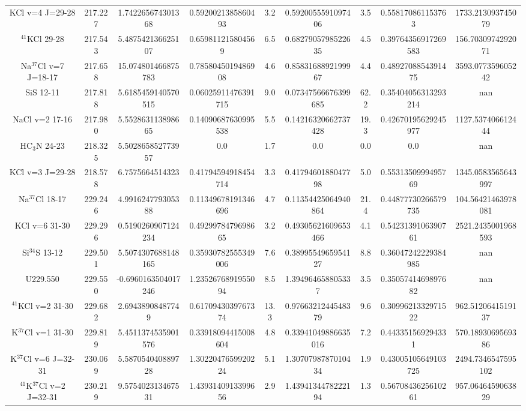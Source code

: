 \begin{table*}[htp]
\begin{tabular}{ccccccccc}
KCl v=4 J=29-28 & 217.227 & 1.742265674301368 & 0.5920021385860493 & 3.2 & 0.5920055591097406 & 3.5 & 0.558170861153763 & 1733.213093745079 \\
$^{41}$KCl 29-28 & 217.543 & 5.487542136625107 & 0.659811215804569 & 6.5 & 0.6827905798522635 & 4.5 & 0.39764356917269583 & 156.7030974292071 \\
Na$^{37}$Cl v=7 J=18-17 & 217.658 & 15.074801466875783 & 0.7858045019486908 & 4.6 & 0.8583168892199967 & 4.4 & 0.4892708854391475 & 3593.077359605242 \\
SiS 12-11 & 217.818 & 5.6185459140570515 & 0.06025911476391715 & 9.0 & 0.07347566676399685 & 62.2 & 0.35404056313293214 & nan \\
NaCl v=2 17-16 & 217.980 & 5.552863113898665 & 0.14090687630995538 & 5.5 & 0.14216320662737428 & 19.3 & 0.42670195629245977 & 1127.537406612444 \\
HC$_3$N 24-23 & 218.325 & 5.502865852773957 & 0.0 & 1.7 & 0.0 & 0.0 & 0.0 & nan \\
KCl v=3 J=29-28 & 218.578 & 6.7575664514323 & 0.41794594918454714 & 3.3 & 0.4179460188047798 & 5.0 & 0.5531350999495769 & 1345.0583565643997 \\
Na$^{37}$Cl 18-17 & 229.246 & 4.991624779305388 & 0.11349678191346696 & 4.7 & 0.11354425064940864 & 21.4 & 0.44877730266579735 & 104.56421463978081 \\
KCl v=6 31-30 & 229.296 & 0.5190260907124234 & 0.4929978479698665 & 3.2 & 0.49305621609653466 & 4.1 & 0.5423139106390761 & 2521.2435001968593 \\
Si$^{34}$S 13-12 & 229.501 & 5.5074307688148165 & 0.35930782555349006 & 7.6 & 0.3899554965954127 & 8.8 & 0.36047242229384985 & nan \\
U229.550 & 229.550 & -0.6960163504017246 & 1.2352676891955094 & 8.5 & 1.394964658805337 & 3.5 & 0.3505741469897682 & nan \\
$^{41}$KCl v=2 31-30 & 229.682 & 2.69438908487749 & 0.6170943039767374 & 13.3 & 0.9766321244548379 & 9.6 & 0.3099621332971522 & 962.5120641519137 \\
K$^{37}$Cl v=1 31-30 & 229.819 & 5.4511374535901576 & 0.33918094415008604 & 4.8 & 0.33941049886635016 & 7.2 & 0.443351569294331 & 570.1893069569386 \\
K$^{37}$Cl v=6 J=32-31 & 230.069 & 5.587054040889728 & 1.3022047659920224 & 5.1 & 1.3070798787010434 & 1.9 & 0.43005105649103725 & 2494.7346547595102 \\
$^{41}$K$^{37}$Cl v=2 J=32-31 & 230.219 & 9.575402313467531 & 1.4393140913399656 & 2.9 & 1.4394134478222194 & 1.3 & 0.5670843625610261 & 957.0646459063829 \\

\end{tabular}
\end{table*}
